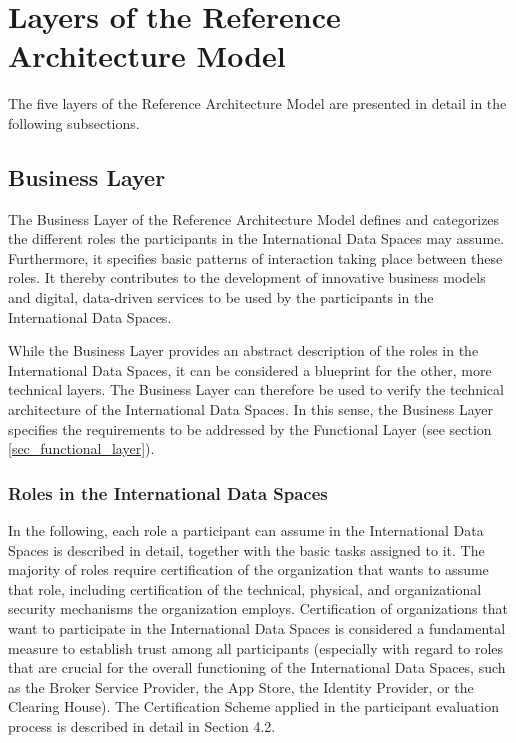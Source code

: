 \section{Layers of the Reference Architecture Model}\label{sec:layers}
The five layers of the Reference Architecture Model are presented in detail in the following subsections.

\subsection{Business Layer}\label{subsec:business_layer}
The Business Layer of the Reference Architecture Model defines and categorizes the different roles the participants in the International Data Spaces may assume. Furthermore, it specifies basic patterns of interaction taking place between these roles. It thereby contributes to the development of innovative business models and digital, data-driven services to be used by the participants in the International Data Spaces. 

While the Business Layer provides an abstract description of the roles in the International Data Spaces, it can be considered a blueprint for the other, more technical layers. The Business Layer can therefore be used to verify the technical architecture of the International Data Spaces. In this sense, the Business Layer specifies the requirements to be addressed by the Functional Layer (see section \ref{sec_functional_layer}). 

\subsubsection{Roles in the International Data Spaces}
In the following, each role a participant can assume in the International Data Spaces is described in detail, together with the basic tasks assigned to it. The majority of roles require certification of the organization that wants to assume that role, including certification of the technical, physical, and organizational security mechanisms the organization employs. Certification of organizations that want to participate in the International Data Spaces is considered a fundamental measure to establish trust among all participants (especially with regard to roles that are crucial for the overall functioning of the International Data Spaces, such as the Broker Service Provider, the App Store, the Identity Provider, or the Clearing House). The Certification Scheme applied in the participant evaluation process is described in detail in Section 4.2.

